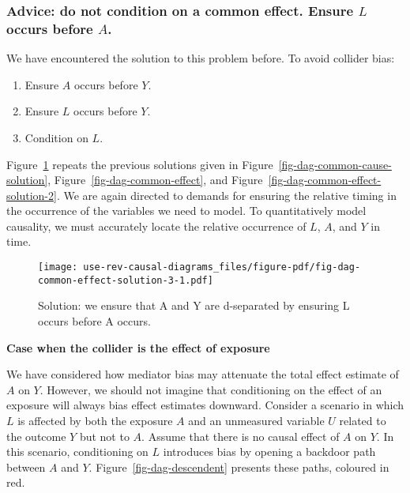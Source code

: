 \documentclass[
  singlecolumn,
  9pt]{article}
\providecommand{\tightlist}{%
  \setlength{\itemsep}{0pt}\setlength{\parskip}{0pt}}\usepackage{longtable,booktabs,array}
\begin{document}
\subsubsection{\texorpdfstring{Advice: do not condition on a common
effect. Ensure \(L\) occurs before
\(A\).}{Advice: do not condition on a common effect. Ensure L occurs before A.}}\label{advice-do-not-condition-on-a-common-effect.-ensure-l-occurs-before-a.}

We have encountered the solution to this problem before. To avoid
collider bias:

\begin{enumerate}
\def\labelenumi{\arabic{enumi}.}
\tightlist
\item
  Ensure \(A\) occurs before \(Y\).
\item
  Ensure \(L\) occurs before \(Y\).
\item
  Condition on \(L\).
\end{enumerate}

Figure~\ref{fig-dag-common-effect-solution-3} repeats the previous
solutions given in Figure~\ref{fig-dag-common-cause-solution},
Figure~\ref{fig-dag-common-effect}, and
Figure~\ref{fig-dag-common-effect-solution-2}. We are again directed to
demands for ensuring the relative timing in the occurrence of the
variables we need to model. To quantitatively model causality, we must
accurately locate the relative occurrence of \(L\), \(A\), and \(Y\) in
time.

\begin{figure}

{\centering \texttt{[image: use-rev-causal-diagrams\_files/figure-pdf/fig-dag-common-effect-solution-3-1.pdf]}

}

\caption{\label{fig-dag-common-effect-solution-3}Solution: we ensure
that A and Y are d-separated by ensuring L occurs before A occurs.}

\end{figure}

\textbf{Case when the collider is the effect of exposure}

We have considered how mediator bias may attenuate the total effect
estimate of \(A\) on \(Y\). However, we should not imagine that
conditioning on the effect of an exposure will always bias effect
estimates downward. Consider a scenario in which \(L\) is affected by
both the exposure \(A\) and an unmeasured variable \(U\) related to the
outcome \(Y\) but not to \(A\). Assume that there is no causal effect of
\(A\) on \(Y\). In this scenario, conditioning on \(L\) introduces bias
by opening a backdoor path between \(A\) and \(Y\).
Figure~\ref{fig-dag-descendent} presents these paths, coloured in red.
\end{document}
